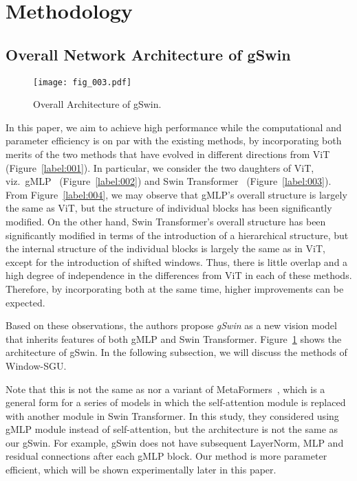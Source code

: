 \documentclass{article}
\begin{document}
\section{Methodology}\label{label:008}
\subsection{Overall Network Architecture of gSwin}
\begin{figure}
    \centering \texttt{[image: fig\_003.pdf]}\caption{Overall Architecture of gSwin.}\label{label:009}\end{figure}
In this paper, we aim to achieve high performance while the computational and parameter efficiency is on par with the existing methods, by incorporating both merits of the two methods that have evolved in different directions from ViT~\citep{dosovitskiy2020image} (Figure~\ref{label:001}). In particular, we consider the two daughters of ViT, viz.\ gMLP~\citep{liu2021pay} (Figure~\ref{label:002}) and Swin Transformer~\citep{liu2021swin} (Figure~\ref{label:003}).
From Figure~\ref{label:004}, we may observe that gMLP’s overall structure is largely the same as ViT, but the structure of individual blocks has been significantly modified. On the other hand, Swin Transformer’s overall structure has been significantly modified in terms of the introduction of a hierarchical structure, but the internal structure of the individual blocks is largely the same as in ViT, except for the introduction of shifted windows.
Thus, there is little overlap and a high degree of independence in the differences from ViT in each of these methods. Therefore, by incorporating both at the same time, higher improvements can be expected.

Based on these observations, the authors propose \textit{gSwin} as a new vision model that inherits features of both gMLP and Swin Transformer. Figure~\ref{label:009} shows the architecture of gSwin. In the following subsection, we will discuss the methods of Window-SGU.

Note that this is not the same as nor a variant of MetaFormers~\citep{yu2021metaformer}, which is a general form for a series of models in which the self-attention module is replaced with another module in Swin Transformer. In this study, they considered using gMLP module instead of self-attention, but the architecture is not the same as our gSwin. For example, gSwin does not have subsequent LayerNorm, MLP and residual connections after each gMLP block. Our method is more parameter efficient, which will be shown experimentally later in this paper.
\end{document}
